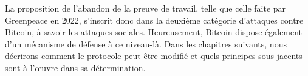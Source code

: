 La proposition de l'abandon de la preuve de travail, telle que celle faite par Greenpeace en 2022, s'inscrit donc dans la deuxième catégorie d'attaques contre Bitcoin, à savoir les attaques sociales. Heureusement, Bitcoin dispose également d'un mécanisme de défense à ce niveau-là. Dans les chapitres suivants, nous décrirons comment le protocole peut être modifié et quels principes sous-jacents sont à l'œuvre dans sa détermination.
